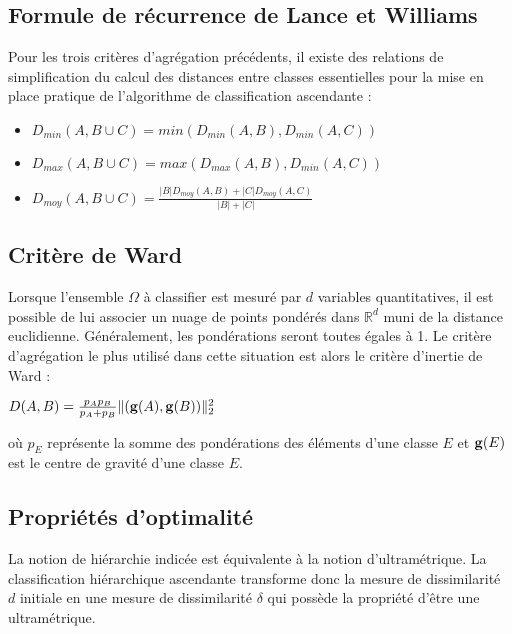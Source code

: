 \documentclass[letterpaper,10pt,french]{sphinxmanual}
\begin{document}
\sphinxAtStartPar
{}


\subsection{Formule de récurrence de Lance et Williams}
\label{\detokenize{clustering:formule-de-recurrence-de-lance-et-williams}}
\sphinxAtStartPar
Pour les trois critères d’agrégation précédents, il existe des relations de simplification du calcul des distances entre classes essentielles pour la mise en place pratique de l’algorithme de classification ascendante :
\begin{itemize}
\item {} 
\sphinxAtStartPar
\(D_{min}(A,B\cup C)=min(D_{min}(A,B),D_{min}(A,C))\)

\item {} 
\sphinxAtStartPar
\(D_{max}(A,B\cup C)=max(D_{max}(A,B),D_{min}(A,C))\)

\item {} 
\sphinxAtStartPar
\(D_{moy}(A,B\cup C)=\frac{|B|D_{moy}(A,B)+|C|D_{moy}(A,C)}{|B|+|C|}\)

\end{itemize}


\subsection{Critère de Ward}
\label{\detokenize{clustering:critere-de-ward}}
\ignorespaces 
\sphinxAtStartPar
Lorsque l’ensemble  \(\Omega\) à classifier est mesuré par \(d\) variables quantitatives, il est possible de lui associer un nuage de points pondérés dans \(\mathbb{R}^d\) muni de la distance euclidienne. Généralement, les pondérations seront toutes égales à 1. Le critère d’agrégation le plus utilisé dans cette situation est alors le critère d’inertie de Ward :

\sphinxAtStartPar
\(D(A,B)=\frac{p_Ap_B}{p_A+p_B}\|({\bf g}(A),{\bf g}(B))\|_2^2\)

\sphinxAtStartPar
où \(p_E\) représente la somme des pondérations des éléments d’une classe \(E\) et \({\bf g}(E)\) est le centre de gravité d’une classe \(E\).


\subsection{Propriétés d’optimalité}
\label{\detokenize{clustering:proprietes-d-optimalite}}
\sphinxAtStartPar
La notion de hiérarchie indicée est équivalente à la notion d’ultramétrique. La classification hiérarchique ascendante transforme donc la mesure de dissimilarité \(d\) initiale en une mesure de dissimilarité \(\delta\) qui possède la propriété d’être une ultramétrique.
\end{document}
